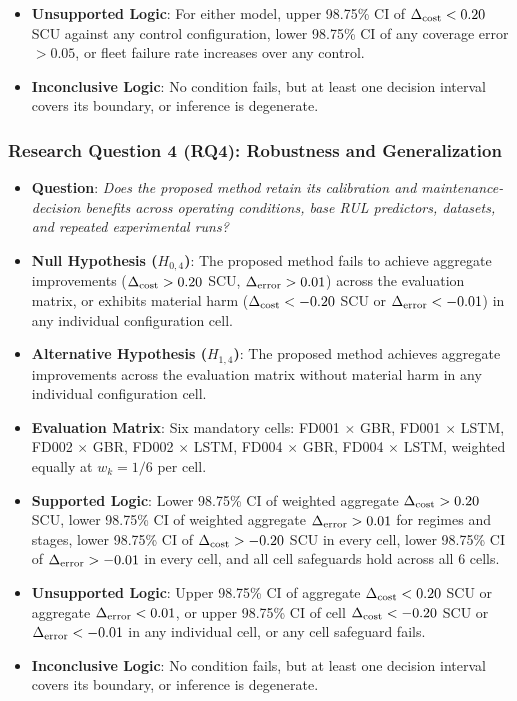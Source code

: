 \begin{itemize}
  \item \textbf{Unsupported Logic}: For either model, upper 98.75\% CI of $\Delta_{\text{cost}} < 0.20$ SCU against any control configuration, lower 98.75\% CI of any coverage error $> 0.05$, or fleet failure rate increases over any control.
  \item \textbf{Inconclusive Logic}: No condition fails, but at least one decision interval covers its boundary, or inference is degenerate.
\end{itemize}

\subsubsection*{Research Question 4 (RQ4): Robustness and Generalization}
\begin{itemize}
  \item \textbf{Question}: \textit{Does the proposed method retain its calibration and maintenance-decision benefits across operating conditions, base RUL predictors, datasets, and repeated experimental runs?}
  \item \textbf{Null Hypothesis ($H_{0,4}$)}: The proposed method fails to achieve aggregate improvements ($\Delta_{\text{cost}} > 0.20$ SCU, $\Delta_{\text{error}} > 0.01$) across the evaluation matrix, or exhibits material harm ($\Delta_{\text{cost}} < -0.20$ SCU or $\Delta_{\text{error}} < -0.01$) in any individual configuration cell.
  \item \textbf{Alternative Hypothesis ($H_{1,4}$)}: The proposed method achieves aggregate improvements across the evaluation matrix without material harm in any individual configuration cell.
  \item \textbf{Evaluation Matrix}: Six mandatory cells: FD001 $\times$ GBR, FD001 $\times$ LSTM, FD002 $\times$ GBR, FD002 $\times$ LSTM, FD004 $\times$ GBR, FD004 $\times$ LSTM, weighted equally at $w_k = 1/6$ per cell.
  \item \textbf{Supported Logic}: Lower 98.75\% CI of weighted aggregate $\Delta_{\text{cost}} > 0.20$ SCU, lower 98.75\% CI of weighted aggregate $\Delta_{\text{error}} > 0.01$ for regimes and stages, lower 98.75\% CI of $\Delta_{\text{cost}} > -0.20$ SCU in every cell, lower 98.75\% CI of $\Delta_{\text{error}} > -0.01$ in every cell, and all cell safeguards hold across all 6 cells.
  \item \textbf{Unsupported Logic}: Upper 98.75\% CI of aggregate $\Delta_{\text{cost}} < 0.20$ SCU or aggregate $\Delta_{\text{error}} < 0.01$, or upper 98.75\% CI of cell $\Delta_{\text{cost}} < -0.20$ SCU or $\Delta_{\text{error}} < -0.01$ in any individual cell, or any cell safeguard fails.
  \item \textbf{Inconclusive Logic}: No condition fails, but at least one decision interval covers its boundary, or inference is degenerate.
\end{itemize}

